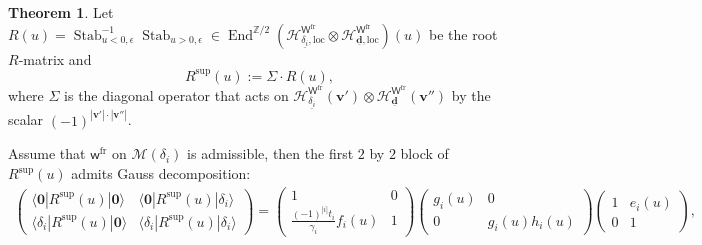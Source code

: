 \documentclass[10pt]{amsart}
\theoremstyle{definition}
\newtheorem{Theorem}{Theorem}[section]
\numberwithin{equation}{section}
\newcommand{\bZ}{\mathbb{Z}}
\newcommand{\bv}{\mathbf{v}}
\newcommand{\bd}{\mathbf{d}}
\newcommand{\cH}{\mathcal{H}}
\newcommand{\cM}{\mathcal{M}}
\newcommand{\sW}{\mathsf{W}}
\newcommand{\sw}{\mathsf{w}}
\newcommand{\End}{\operatorname{End}}
\newcommand{\Stab}{\operatorname{Stab}}
\begin{document}
\begin{Theorem}\label{thm e f h as R matrix elements}
Let $R(u)=\Stab_{u<0,\epsilon}^{-1}\Stab_{u>0,\epsilon}\in \End^{\bZ/2}\left(\cH^{\sW^{\mathrm{fr}}}_{\underline{\delta_i},\mathrm{loc}}\otimes\cH^{\sW^{\mathrm{fr}}}_{\underline{\bd},\mathrm{loc}}\right)(u)$ be the root $R$-matrix
and $$R^{\mathrm{sup}}(u):=\Sigma\cdot R(u), $$ 
where $\Sigma$ is the diagonal operator that acts on $\cH^{\sW^{\mathrm{fr}}}_{\underline{\delta_i}}(\bv')\otimes\cH^{\sW^{\mathrm{fr}}}_{\underline{\bd}}(\bv'')$ by the scalar $(-1)^{|\bv'|\cdot |\bv''|}$. 

Assume that $\sw^{\mathrm{fr}}$ on $\cM(\delta_i)$ is admissible, then the first $2$ by $2$ block of $R^{\mathrm{sup}}(u)$ admits Gauss decomposition:
\begin{align}\label{gauss decomp of R}
\begin{pmatrix}
\langle\mathbf 0|R^{\mathrm{sup}}(u)|\mathbf 0\rangle & \langle\mathbf 0|R^{\mathrm{sup}}(u)|\delta_i\rangle \\
\langle\delta_i|R^{\mathrm{sup}}(u)|\mathbf 0\rangle & \langle\delta_i|R^{\mathrm{sup}}(u)|\delta_i\rangle
\end{pmatrix}=
\begin{pmatrix}
1 & 0 \\
\frac{(-1)^{|i|} t_i}{\gamma_i}f_i(u) & 1
\end{pmatrix}
\begin{pmatrix}
g_i(u) & 0 \\
0 & g_i(u)h_i(u) 
\end{pmatrix}
\begin{pmatrix}
1 & e_i(u)\\
0 & 1 
\end{pmatrix},
\end{align}

\end{Theorem}
\end{document}
